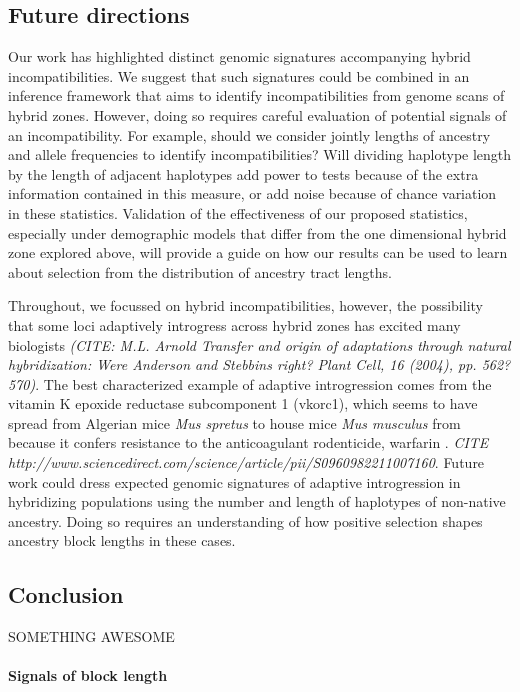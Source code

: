 \documentclass[12pt]{article}
\newcommand{\yb}[1]{{\em \color{magenta} #1}}
\begin{document}
\subsection*{Future directions}
Our work has highlighted distinct genomic signatures accompanying hybrid incompatibilities. 
We suggest that such signatures could be combined in an inference framework that aims to identify incompatibilities from genome scans of hybrid zones.  
However, doing so requires careful evaluation of potential signals of an incompatibility. 
For example, should we consider jointly lengths of ancestry and allele frequencies to identify incompatibilities?
Will dividing haplotype length by the length of adjacent haplotypes add power to tests because of the extra information contained in this measure, or add noise because of chance variation in these statistics.  
Validation of the effectiveness of our proposed statistics, especially under demographic models that differ from the one dimensional hybrid zone explored above, will  provide a guide on how our results can be used to learn about selection from the distribution of ancestry tract lengths.

Throughout, we focussed on hybrid incompatibilities, however, the possibility that some loci adaptively introgress across hybrid zones has excited many biologists \yb{(CITE: M.L. Arnold Transfer and origin of adaptations through natural hybridization: Were Anderson and Stebbins right? Plant Cell, 16 (2004), pp. 562?570)}.   
The best characterized example of adaptive introgression comes from the vitamin K epoxide reductase subcomponent 1 (vkorc1), which seems to have spread from Algerian mice \emph{Mus spretus} to house mice \emph{Mus musculus} from because it confers resistance to the anticoagulant rodenticide, warfarin .\yb{CITE http://www.sciencedirect.com/science/article/pii/S0960982211007160}. 
Future work could dress expected genomic signatures of adaptive introgression in hybridizing populations using the number and length of haplotypes of non-native ancestry. 
Doing so requires an understanding of how positive selection shapes ancestry block lengths in these cases. 

\subsection*{Conclusion}
SOMETHING AWESOME

\paragraph{Signals of block length}
\end{document}
